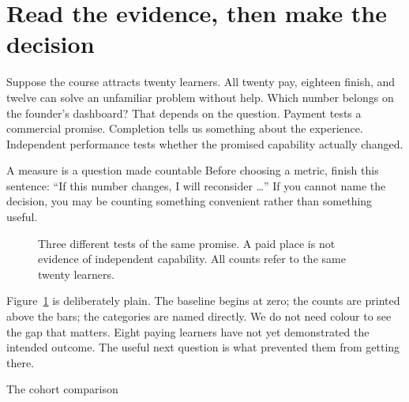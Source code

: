 \documentclass[11pt,twoside,openright]{book}
\begin{document}
\section{Read the evidence, then make the decision}
Suppose the course attracts twenty learners. All twenty pay, eighteen finish,
and twelve can solve an unfamiliar problem without help. Which number belongs
on the founder's dashboard? That depends on the question. Payment tests a
commercial promise. Completion tells us something about the experience.
Independent performance tests whether the promised capability actually changed.

\begin{DefinitionBox}{A measure is a question made countable}
Before choosing a metric, finish this sentence: ``If this number changes,
I will reconsider \ldots'' If you cannot name the decision, you may be counting
something convenient rather than something useful.
\end{DefinitionBox}

\begin{figure}[H]
\centering
{}
\caption{Three different tests of the same promise. A paid place is not evidence
of independent capability. All counts refer to the same twenty learners.}
\label{fig:cohort-evidence}
\end{figure}

Figure~\ref{fig:cohort-evidence} is deliberately plain. The baseline begins at
zero; the counts are printed above the bars; the categories are named directly.
We do not need colour to see the gap that matters. Eight paying learners have
not yet demonstrated the intended outcome. The useful next question is what
prevented them from getting there.

\begin{EvidenceNote}{The cohort comparison}
\end{EvidenceNote}
\end{document}
